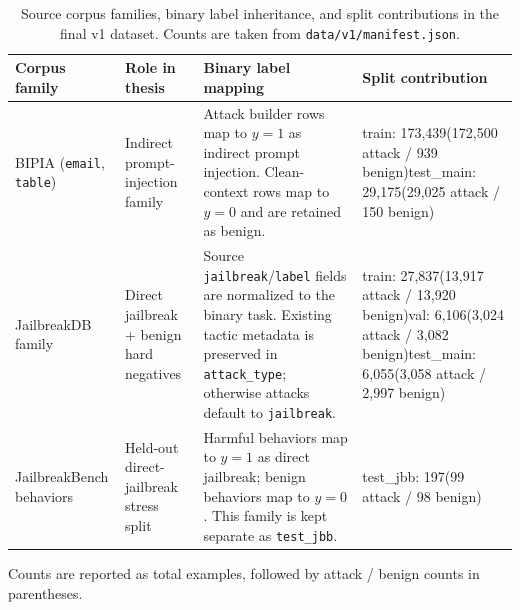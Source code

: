 \begin{table}[t]
\centering
\caption{Source corpus families, binary label inheritance, and split contributions in the final v1 dataset. Counts are taken from \texttt{data/v1/manifest.json}.}
\label{tab:dataset_sources}
\footnotesize
\setlength{\tabcolsep}{4pt}
\renewcommand{\arraystretch}{1.15}
\begin{tabularx}{\textwidth}{>{\raggedright\arraybackslash}p{}>{\raggedright\arraybackslash}p{}>{\raggedright\arraybackslash}p{}X}
\toprule
Corpus family & Role in thesis & Binary label mapping & Split contribution \\
\midrule
BIPIA (\texttt{email}, \texttt{table}) & Indirect prompt-injection family & Attack builder rows map to $y=1$ as indirect prompt injection. Clean-context rows map to $y=0$ and are retained as benign. & train: 173,439\newline(172,500 attack / 939 benign)\newline test\_main: 29,175\newline(29,025 attack / 150 benign) \\
JailbreakDB family & Direct jailbreak + benign hard negatives & Source \texttt{jailbreak}/\texttt{label} fields are normalized to the binary task. Existing tactic metadata is preserved in \texttt{attack\_type}; otherwise attacks default to \texttt{jailbreak}. & train: 27,837\newline(13,917 attack / 13,920 benign)\newline val: 6,106\newline(3,024 attack / 3,082 benign)\newline test\_main: 6,055\newline(3,058 attack / 2,997 benign) \\
JailbreakBench behaviors & Held-out direct-jailbreak stress split & Harmful behaviors map to $y=1$ as direct jailbreak; benign behaviors map to $y=0$. This family is kept separate as \texttt{test\_jbb}. & test\_jbb: 197\newline(99 attack / 98 benign) \\
\bottomrule
\end{tabularx}
\par\vspace{0.3em}
{\footnotesize Counts are reported as total examples, followed by attack / benign counts in parentheses.}
\setlength{\tabcolsep}{6pt}
\renewcommand{\arraystretch}{1}
\normalsize
\end{table}
